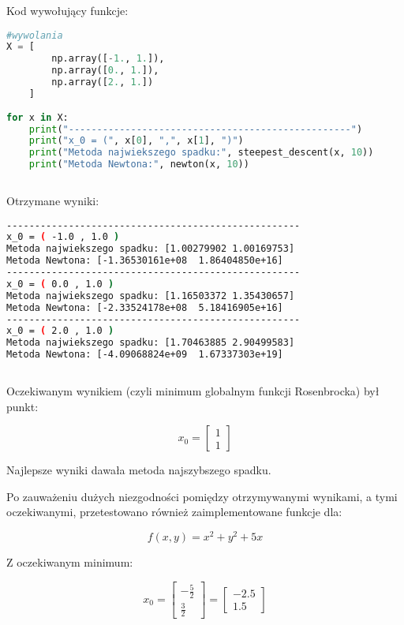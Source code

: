 \documentclass{article}
\begin{document}
	Kod wywołujący funkcje:

	\begin{lstlisting}[language=Python]
#wywolania
X = [
		np.array([-1., 1.]),
		np.array([0., 1.]),
		np.array([2., 1.])
	]
		
for x in X:
	print("--------------------------------------------------")
	print("x_0 = (", x[0], ",", x[1], ")")
	print("Metoda najwiekszego spadku:", steepest_descent(x, 10))
	print("Metoda Newtona:", newton(x, 10))
		
	\end{lstlisting}


	Otrzymane wyniki:

	\begin{lstlisting}[language=bash]
----------------------------------------------------
x_0 = ( -1.0 , 1.0 )
Metoda najwiekszego spadku: [1.00279902 1.00169753]
Metoda Newtona: [-1.36530161e+08  1.86404850e+16]
----------------------------------------------------
x_0 = ( 0.0 , 1.0 )
Metoda najwiekszego spadku: [1.16503372 1.35430657]
Metoda Newtona: [-2.33524178e+08  5.18416905e+16]
----------------------------------------------------
x_0 = ( 2.0 , 1.0 )
Metoda najwiekszego spadku: [1.70463885 2.90499583]
Metoda Newtona: [-4.09068824e+09  1.67337303e+19]
				
	\end{lstlisting}

	Oczekiwanym wynikiem (czyli minimum globalnym funkcji Rosenbrocka) był punkt:

	\begin{equation}
		x_0 = \begin{bmatrix} 1 \\ 1 \end{bmatrix}
	\end{equation}

	Najlepsze wyniki dawała metoda najszybszego spadku.

	\newpage

	Po zauważeniu dużych niezgodności pomiędzy otrzymywanymi wynikami, a tymi oczekiwanymi, przetestowano również zaimplementowane funkcje dla:

	\begin{equation}
		f(x,y) = x^2+y^2+5x
	\end{equation}

	Z oczekiwanym minimum:

	\begin{equation}
		x_0 = \begin{bmatrix} -\frac{5}{2} \\ \frac{3}{2} \end{bmatrix}  = \begin{bmatrix} -2.5 \\ 1.5 \end{bmatrix}
	\end{equation}
\end{document}
